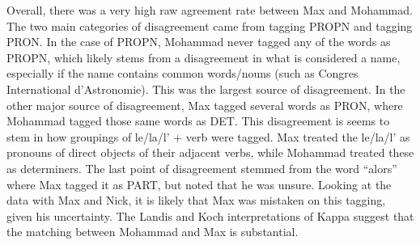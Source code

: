 \documentclass{article}\usepackage[]{graphicx}\usepackage[]{color}
\begin{document}
Overall, there was a very high raw agreement rate between Max and Mohammad. The two main  categories of disagreement came from tagging PROPN and tagging PRON. In the case of PROPN, Mohammad never tagged any of the words as PROPN, which likely stems from a disagreement in what is considered a name, especially if the name contains common words/nouns (such as Congres International d'Astronomie). This was the largest source of disagreement. In the other major source of disagreement, Max tagged several words as PRON, where Mohammad tagged those same words as DET. This disagreement is seems to stem in how groupings of le/la/l' + verb were tagged. Max treated the le/la/l' as pronouns of direct objects of their adjacent verbs, while Mohammad treated these as determiners. The last point of disagreement stemmed from the word “alors” where Max tagged it as PART, but noted that he was unsure. Looking at the data with Max and Nick, it is likely that Max was mistaken on this tagging, given his uncertainty. The Landis and Koch interpretations of Kappa suggest that the matching between Mohammad and Max is substantial.
\end{document}
